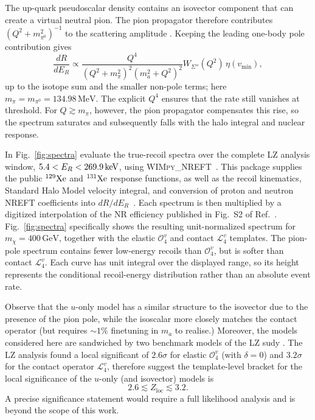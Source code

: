 \documentclass[notitlepage,floats,aps,nofootinbib,preprintnumbers,twocolumn,prl,10pt,balancelastpage]{revtex4-1}
\newcommand{\Lag}{\mathcal L}
\newcommand{\Ocal}{\mathcal O}
\begin{document}
The up-quark pseudoscalar density contains an isovector component that can
create a virtual neutral pion.  The pion propagator therefore contributes
$(Q^2+m_{\pi^0}^2)^{-1}$ to the scattering amplitude
\cite{Bishara:2017pfq}.  Keeping the leading one-body pole contribution gives
\begin{equation}
 \frac{dR}{dE_R}\propto
 \frac{Q^4}
 {(Q^2+m_{\pi}^2)^2(m_a^2+Q^2)^2}
 W_{\Sigma''}(Q^2)\,\eta(v_{\min}),
 \label{eq:polespectrum}
\end{equation}
up to the isotope sum and the smaller non-pole terms; here
$m_\pi=m_{\pi^0}=134.98\,\mathrm{MeV}$.  The explicit $Q^4$ ensures that the
rate still vanishes at threshold.  For $Q\gtrsim m_\pi$, however, the pion
propagator compensates this rise, so the spectrum saturates and subsequently
falls with the halo integral and nuclear response.

In Fig.~\ref{fig:spectra} evaluate the true-recoil spectra over
the complete LZ analysis window, $5.4<E_R<269.9\,{\rm keV}$, using
\textsc{WIMpy\_NREFT}~\cite{WIMpy}.  This package supplies the public
$^{129}{\rm Xe}$ and $^{131}{\rm Xe}$ response functions,
as well as the recoil kinematics, Standard Halo Model velocity
integral, and conversion of proton and neutron NREFT coefficients into
$dR/dE_R$~\cite{Fitzpatrick:2012ix}. 
 Each spectrum is then multiplied by a
digitized interpolation of the NR efficiency published in Fig.~S2 of
Ref.~\cite{LZ:2026axp}. 
Fig.~\ref{fig:spectra} specifically shows the resulting unit-normalized spectrum for
$m_\chi=400\,\mathrm{GeV}$, together with the elastic $\Ocal_4^v$ and contact
$\Lag_4^v$ templates.  The pion-pole spectrum contains
fewer low-energy recoils than $\Ocal_4^v$, but is softer than contact
$\Lag_4^v$.  Each curve has unit integral over the displayed range, so its
height represents the conditional recoil-energy distribution rather than an
absolute event rate.


Observe that the $u$-only model has a similar structure to the isovector due to the presence of the pion pole, while the isoscalar more closely matches the contact operator (but requires $\sim1$\% finetuning in $m_a$ to realise.) Moreover, the models considered here are sandwiched by two benchmark models of the LZ sudy  \cite{LZ:2026axp}.   The LZ analysis found a local significant of $2.6\sigma$ for elastic $\Ocal_4^v$ (with $\delta=0$) and $3.2\sigma$ for the contact operator
$\Lag_4^v$, therefore suggest the template-level bracket for the local significance of the $u$-only (and isovector) models is
\[
 2.6\lesssim Z_{\mathrm{loc}}\lesssim3.2 .
\]
 A precise significance statement would require a full likelihood analysis and is beyond the scope of this work.
\end{document}
